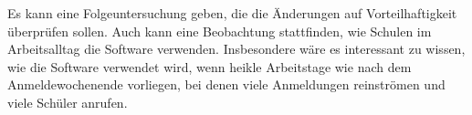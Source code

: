 Es kann eine Folgeuntersuchung geben, die die Änderungen auf Vorteilhaftigkeit überprüfen sollen.
Auch kann eine Beobachtung stattfinden, wie Schulen im Arbeitsalltag die Software verwenden. Insbesondere wäre es interessant zu wissen, wie die Software verwendet wird, wenn heikle Arbeitstage wie nach dem Anmeldewochenende vorliegen, bei denen viele Anmeldungen reinströmen und viele Schüler anrufen.